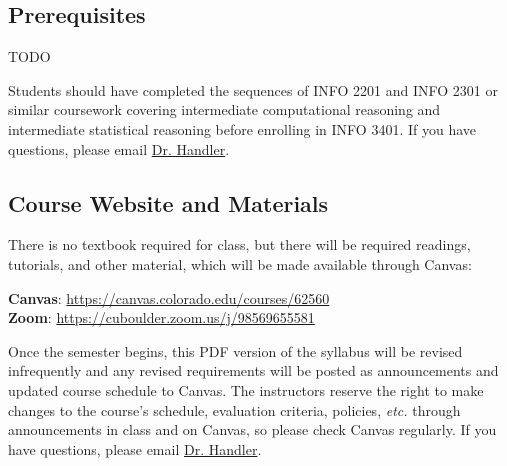 \documentclass[10pt]{memoir}
\makeatletter
\def\mycourselisting{INFO 3401}
\def\myzoomurl{https://cuboulder.zoom.us/j/98569655581}
\def\mycanvasurl{https://canvas.colorado.edu/courses/62560}
\def\instructorAlastname{Handler}
\def\instructorAemail{abe.handler@colorado.edu}
\makeatother
\begin{document}
\subsection{Prerequisites}

TODO

Students should have completed the sequences of INFO 2201 and INFO 2301 or similar coursework covering intermediate computational reasoning and intermediate statistical reasoning before enrolling in \mycourselisting. If you have questions, please email \href{mailto:\instructorAemail}{Dr. \instructorAlastname}.


\subsection{Course Website and Materials}
There is no textbook required for class, but there will be required readings, tutorials, and other material, which will be made available through Canvas:
\vspace{-8pt}
    \begin{center}
    \Large{\textbf{Canvas}: \href{\mycanvasurl}{\mycanvasurl}}\\
    \Large{\textbf{Zoom}: \href{\myzoomurl}{\myzoomurl}}
    \end{center}
\vspace{-8pt}
Once the semester begins, this PDF version of the syllabus will be revised infrequently and any revised requirements will be posted as announcements and updated course schedule to Canvas. The instructors reserve the right to make changes to the course's schedule, evaluation criteria, policies, \textit{etc.} through announcements in class and on Canvas, so please check Canvas regularly. If you have questions, please email \href{mailto:\instructorAemail}{Dr. \instructorAlastname}.

\end{document}

